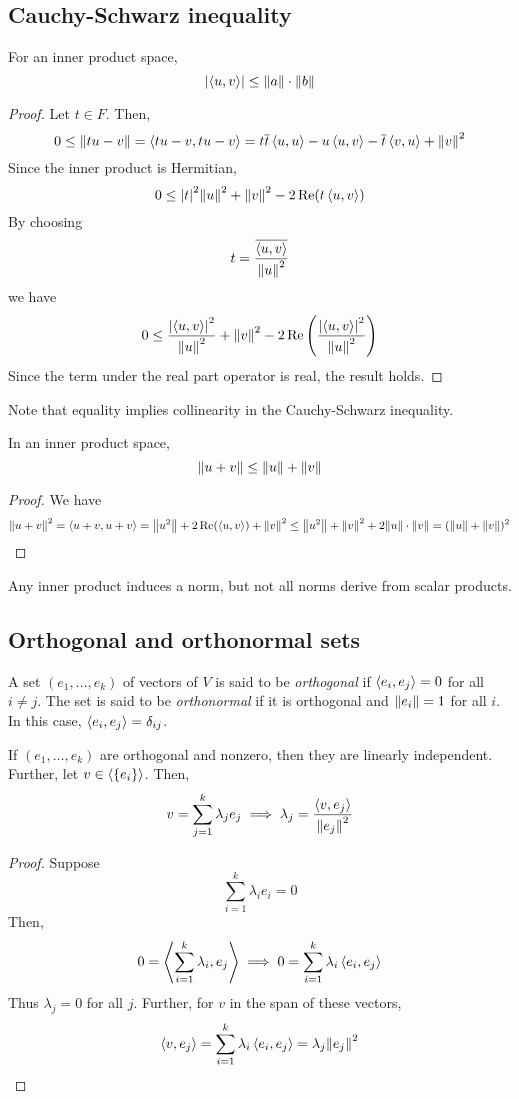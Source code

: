 \subsection{Cauchy-Schwarz inequality}
\begin{lemma}
	For an inner product space,
	\[
		\abs{\left\langle{u,v}\right\rangle} \leq \norm{a} \cdot \norm{b}
	\]
\end{lemma}
\begin{proof}
	Let \( t \in F \).
	Then,
	\[
		0 \leq \norm{t u - v} = \left\langle{tu - v, tu - v}\right\rangle = t \overline t \left\langle{u,u}\right\rangle - u \left\langle{u,v}\right\rangle - \overline t \left\langle{v,u}\right\rangle + \norm{v}^2
	\]
	Since the inner product is Hermitian,
	\[
		0 \leq \abs{t}^2 \norm{u}^2 + \norm{v}^2 - 2 \operatorname{Re}(t \left\langle{u,v}\right\rangle)
	\]
	By choosing
	\[
		t = \frac{\overline{\left\langle{u,v}\right\rangle}}{\norm{u}^2}
	\]
	we have
	\[
		0 \leq \frac{\abs{\left\langle{u,v}\right\rangle}^2}{\norm{u}^2} + \norm{v}^2 - 2 \operatorname{Re}\qty(\frac{\abs{\left\langle{u,v}\right\rangle}^2}{\norm{u}^2})
	\]
	Since the term under the real part operator is real, the result holds.
\end{proof}
Note that equality implies collinearity in the Cauchy-Schwarz inequality.
\begin{corollary}
	In an inner product space,
	\[
		\norm{u+v} \leq \norm{u} + \norm{v}
	\]
\end{corollary}
\begin{proof}
	We have
	\[
		\norm{u+v}^2 = \left\langle{u+v, u+v}\right\rangle = \norm{u^2} + 2 \operatorname{Re}(\left\langle{u,v}\right\rangle) + \norm{v}^2 \leq \norm{u^2} + \norm{v}^2 + 2 \norm{u} \cdot \norm{v} = (\norm{u} + \norm{v})^2
	\]
\end{proof}
\begin{remark}
	Any inner product induces a norm, but not all norms derive from scalar products.
\end{remark}

\subsection{Orthogonal and orthonormal sets}
\begin{definition}
	A set \( (e_1, \dots, e_k) \) of vectors of \( V \) is said to be \textit{orthogonal} if \( \left\langle{e_i, e_j}\right\rangle = 0 \) for all \( i \neq j \).
	The set is said to be \textit{orthonormal} if it is orthogonal and \( \norm{e_i} = 1 \) for all \( i \).
	In this case, \( \left\langle{e_i, e_j}\right\rangle = \delta_{ij} \).
\end{definition}
\begin{lemma}
	If \( (e_1, \dots, e_k) \) are orthogonal and nonzero, then they are linearly independent.
	Further, let \( v \in \left\langle{} \qty{e_i} \right\rangle \).
	Then,
	\[
		v = \sum_{j=1}^k \lambda_j e_j \implies \lambda_j = \frac{\left\langle{v, e_j}\right\rangle}{\norm{e_j}^2}
	\]
\end{lemma}
\begin{proof}
	Suppose
	\[
		\sum_{i=1}^k \lambda_i e_i = 0
	\]
	Then,
	\[
		0 = \left\langle{\sum_{i=1}^k \lambda_i, e_j}\right\rangle \implies 0 = \sum_{i=1}^k \lambda_i \left\langle{e_i, e_j}\right\rangle
	\]
	Thus \( \lambda_j = 0 \) for all \( j \).
	Further, for \( v \) in the span of these vectors,
	\[
		\left\langle{v, e_j}\right\rangle = \sum_{i=1}^k \lambda_i \left\langle{e_i, e_j}\right\rangle = \lambda_j \norm{e_j}^2
	\]
\end{proof}

